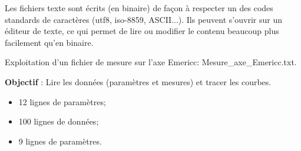 \documentclass[10pt,fleqn]{article} %
\begin{document}
Les fichiers texte sont écrits (en binaire) de façon à respecter un des codes standards de caractères (utf8, iso-8859, ASCII...).
Ils peuvent s'ouvrir sur un éditeur de texte, ce qui permet de lire ou modifier le contenu beaucoup plus facilement qu'en binaire.


\begin{exemple}

Exploitation d'un fichier de mesure sur l'axe Emericc: \textsf{Mesure\_axe\_Emericc.txt}.

\textbf{Objectif} : Lire les données (paramètres et mesures) et tracer les courbes.

\begin{itemize}
\item 12 lignes de paramètres;
\item 100 lignes de données;
\item 9 lignes de paramètres.
\end{itemize}


\end{exemple}
\end{document}
